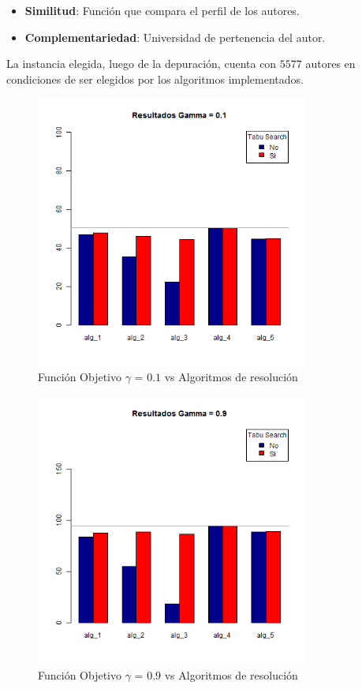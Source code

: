 \begin{itemize}
  \item \textbf{Similitud}: Función que compara el perfil de los autores.
  \item \textbf{Complementariedad}: Universidad de pertenencia del autor.
\end{itemize}

La instancia elegida, luego de la depuración, cuenta con $5577$ autores en condiciones de ser elegidos por los algoritmos implementados.

\begin{figure}[H]
  \centering
    \includegraphics[width=0.8\textwidth]{resultados/authors/Graficos_agrupados/gamma01-autores.png}
  \caption{Función Objetivo $\gamma$ = $0.1$ vs Algoritmos de resolución}
  \label{res:img-autores-agr-gamma01}
\end{figure}

\begin{figure}[H]
  \centering
    \includegraphics[width=0.8\textwidth]{resultados/authors/Graficos_agrupados/gamma09-autores.png}
  \caption{Función Objetivo $\gamma$ = $0.9$ vs Algoritmos de resolución}
  \label{res:img-autores-agr-gamma09}
\end{figure}

